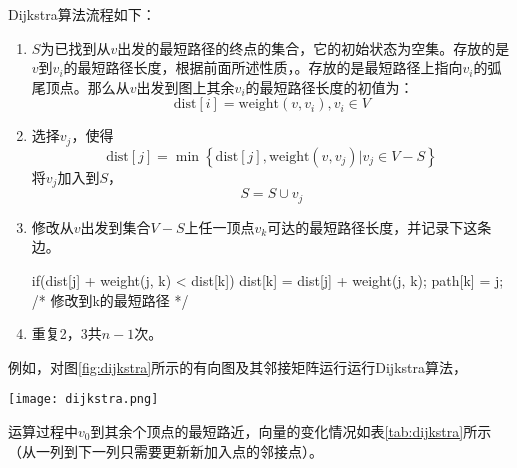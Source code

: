 Dijkstra算法流程如下：
\begin{enumerate}
\item $S$为已找到从$v$出发的最短路径的终点的集合，它的初始状态为空集。存放的是$v$到$v_i$的最短路径长度，根据前面所述性质，。存放的是最短路径上指向$v_i$的弧尾顶点。那么从$v$出发到图上其余$v_i$的最短路径长度的初值为：
$$
\text{dist}[i] = \text{weight}(v, v_i), v_i \in V
$$
\item 选择$v_j$，使得
$$
\text{dist}[j]=\min\left\{\text{dist}[j], \text{weight}(v, v_j)|v_j \in V-S\right\}
$$
将$v_j$加入到$S$，
$$
S = S \cup {v_j}
$$
\item 修改从$v$出发到集合$V-S$上任一顶点$v_k$可达的最短路径长度，并记录下这条边。
\begin{Code}
if(dist[j] + weight(j, k) < dist[k]) {
    dist[k] = dist[j] + weight(j, k);
    path[k] = j; /* 修改到k的最短路径 */
}
\end{Code}
\item 重复2，3共$n-1$次。
\end{enumerate}

例如，对图\ref{fig:dijkstra}所示的有向图及其邻接矩阵运行运行Dijkstra算法，

\begin{center}
\texttt{[image: dijkstra.png]}\\
\label{fig:dijkstra}
\end{center}

运算过程中$v_0$到其余个顶点的最短路近，向量的变化情况如表\ref{tab:dijkstra}所示（从一列到下一列只需要更新新加入点的邻接点）。

